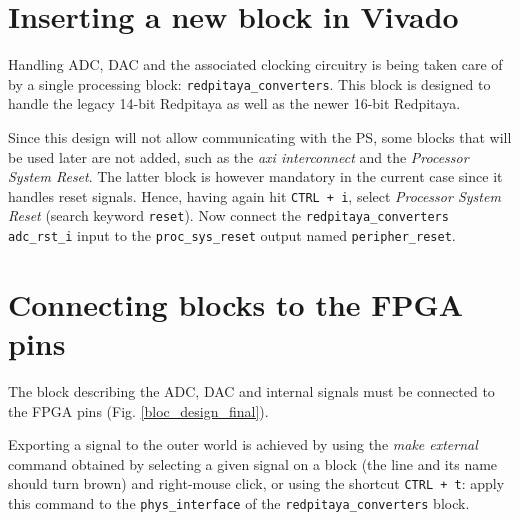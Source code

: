 \documentclass[10pt,oneside]{article}
\begin{document}
\section{Inserting a new block in Vivado}

Handling ADC, DAC and the associated clocking circuitry is being taken care
of by a single processing block: {\tt redpitaya\_converters}. This block is designed
to handle the legacy 14-bit Redpitaya as well as the newer 16-bit Redpitaya.

Since this design will not allow communicating with the PS, some blocks that will
be used later are not added, such as the {\em axi interconnect} and the
{\em Processor System Reset}. The latter block is however mandatory in the current case
since it handles reset signals. Hence, having again hit {\tt CTRL + i}, select 
{\em Processor System Reset} (search keyword {\tt reset}). Now connect the {\tt redpitaya\_converters}
{\tt adc\_rst\_i} input to the {\tt proc\_sys\_reset} output named {\tt peripher\_reset}.

\section{Connecting blocks to the FPGA pins}

The block describing the ADC, DAC and internal signals must be connected
to the FPGA pins (Fig. \ref{bloc_design_final}).

Exporting a signal to the outer world is achieved by using the {\em make external} command
obtained by selecting a given signal on a block (the line and its name should turn brown) 
and right-mouse click, or using the shortcut {\tt CTRL + t}: apply this command to the
{\tt phys\_interface} of the {\tt redpitaya\_converters} block.
\end{document}
